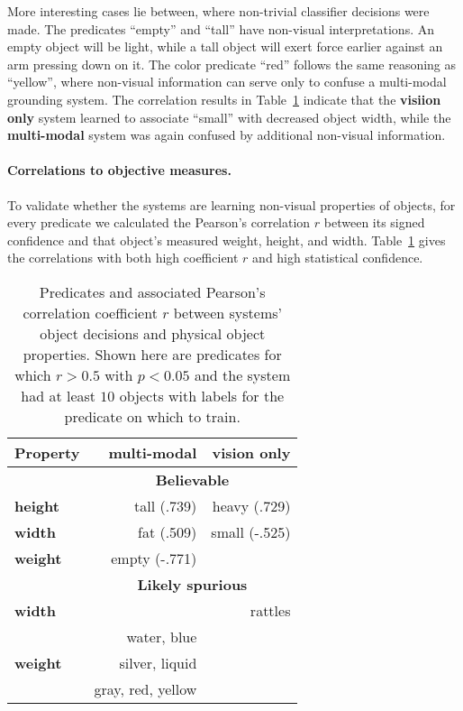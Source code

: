 More interesting cases lie between, where non-trivial classifier decisions were made.
The predicates ``empty'' and ``tall'' have non-visual interpretations.
An empty object will be light, while a tall object will exert force earlier against an arm pressing down on it.
The color predicate ``red'' follows the same reasoning as ``yellow'', where non-visual information can serve only to confuse a multi-modal grounding system.
The correlation results in Table~\ref{tab:predicate_correlations} indicate that the \textbf{visiion only} system learned to associate ``small'' with decreased object width, while the \textbf{multi-modal} system was again confused by additional non-visual information.

\paragraph{Correlations to objective measures.}
To validate whether the systems are learning non-visual properties of objects, for every predicate we calculated the Pearson's correlation $r$ between its signed confidence and that object's measured weight, height, and width. Table~\ref{tab:predicate_correlations} gives the correlations with both high coefficient $r$ and high statistical confidence.

\begin{table}
\centering
\begin{tabular}[h]{|l|r|r|}
	\hline
	\bf Property & \bf multi-modal & \bf vision only \\ \hline \hline
	& \multicolumn{2}{c|}{\bf Believable} \\ \hline
	\bf height & tall (.739) & heavy (.729) \\ \hline
	\bf width & fat (.509) & small (-.525) \\ \hline
	\bf weight & empty (-.771) & \\ \hline \hline
	& \multicolumn{2}{c|}{\bf Likely spurious} \\ \hline
	\bf width & & rattles \\ \hline
	& water, blue & \\
	\bf weight & silver, liquid & \\ 
	& gray, red, yellow & \\ \hline
\end{tabular}
\caption{Predicates and associated Pearson's correlation coefficient $r$ between systems' object decisions and physical object properties.
Shown here are predicates for which $r>0.5$ with $p<0.05$ and the system had at least $10$ objects with labels for the predicate on which to train.}
\label{tab:predicate_correlations}
\end{table}


